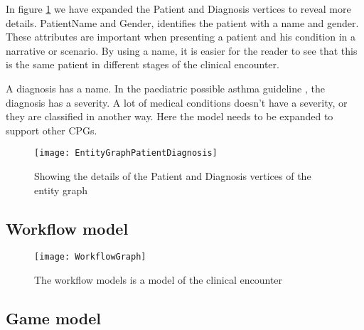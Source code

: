 In figure \ref{fig:EntityGraphPatientDiagnosis} we have expanded the Patient and Diagnosis vertices to reveal more details. PatientName and Gender, identifies the patient with a name and gender. These attributes are important when presenting a patient and his condition in a narrative or scenario. By using a name, it is easier for the reader to see that this is the same patient in different stages of the clinical encounter.

A diagnosis has a name. In the paediatric possible asthma guideline \cite{RepublicofKeny2016}, the diagnosis has a severity. A lot of medical conditions doesn't have a severity, or they are classified in another way. Here the model needs to be expanded to support other CPGs. 
\begin{figure}[h!]
	\caption {Showing the details of the Patient and Diagnosis vertices of the entity graph}
	\label{fig:EntityGraphPatientDiagnosis}
	\texttt{[image: EntityGraphPatientDiagnosis]}
\end{figure}

\subsection{Workflow model}
\begin{figure}[h!]
	\caption {The workflow models is a model of the clinical encounter}
	\label{fig:WorkflowGraph}
	\texttt{[image: WorkflowGraph]}
\end{figure}


\subsection{Game model}